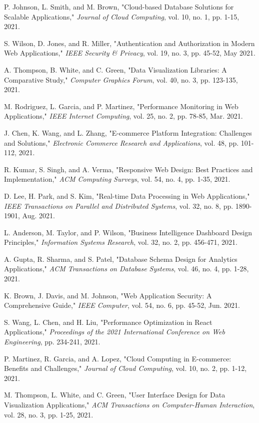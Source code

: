 \documentclass[12pt]{article}
\begin{document}
\begin{thebibliography}{25}
P. Johnson, L. Smith, and M. Brown, "Cloud-based Database Solutions for Scalable Applications," \textit{Journal of Cloud Computing}, vol. 10, no. 1, pp. 1-15, 2021.

S. Wilson, D. Jones, and R. Miller, "Authentication and Authorization in Modern Web Applications," \textit{IEEE Security \& Privacy}, vol. 19, no. 3, pp. 45-52, May 2021.

A. Thompson, B. White, and C. Green, "Data Visualization Libraries: A Comparative Study," \textit{Computer Graphics Forum}, vol. 40, no. 3, pp. 123-135, 2021.

M. Rodriguez, L. Garcia, and P. Martinez, "Performance Monitoring in Web Applications," \textit{IEEE Internet Computing}, vol. 25, no. 2, pp. 78-85, Mar. 2021.

J. Chen, K. Wang, and L. Zhang, "E-commerce Platform Integration: Challenges and Solutions," \textit{Electronic Commerce Research and Applications}, vol. 48, pp. 101-112, 2021.

R. Kumar, S. Singh, and A. Verma, "Responsive Web Design: Best Practices and Implementation," \textit{ACM Computing Surveys}, vol. 54, no. 4, pp. 1-35, 2021.

D. Lee, H. Park, and S. Kim, "Real-time Data Processing in Web Applications," \textit{IEEE Transactions on Parallel and Distributed Systems}, vol. 32, no. 8, pp. 1890-1901, Aug. 2021.

L. Anderson, M. Taylor, and P. Wilson, "Business Intelligence Dashboard Design Principles," \textit{Information Systems Research}, vol. 32, no. 2, pp. 456-471, 2021.

A. Gupta, R. Sharma, and S. Patel, "Database Schema Design for Analytics Applications," \textit{ACM Transactions on Database Systems}, vol. 46, no. 4, pp. 1-28, 2021.

K. Brown, J. Davis, and M. Johnson, "Web Application Security: A Comprehensive Guide," \textit{IEEE Computer}, vol. 54, no. 6, pp. 45-52, Jun. 2021.

S. Wang, L. Chen, and H. Liu, "Performance Optimization in React Applications," \textit{Proceedings of the 2021 International Conference on Web Engineering}, pp. 234-241, 2021.

P. Martinez, R. Garcia, and A. Lopez, "Cloud Computing in E-commerce: Benefits and Challenges," \textit{Journal of Cloud Computing}, vol. 10, no. 2, pp. 1-12, 2021.

M. Thompson, L. White, and C. Green, "User Interface Design for Data Visualization Applications," \textit{ACM Transactions on Computer-Human Interaction}, vol. 28, no. 3, pp. 1-25, 2021.

\end{thebibliography}
\end{document}

